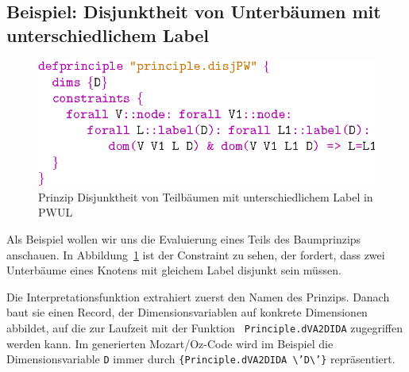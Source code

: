 \subsection{Beispiel: Disjunktheit von Unterb\"aumen mit
  unterschiedlichem Label}
\begin{figure}
\begin{center}
\includegraphics[scale=1.0]{eps/disj}
\end{center}
\caption{Prinzip Disjunktheit von Teilb\"aumen mit unterschiedlichem
  Label in PWUL}
\label{disjunktPW}
\end{figure}
Als Beispiel wollen wir uns die Evaluierung eines Teils des
Baumprinzips anschauen. In Abbildung~\ref{disjunktPW} ist der
Constraint zu sehen, der fordert, dass zwei Unterb\"aume eines Knotens
mit gleichem Label disjunkt sein m\"ussen.

Die Interpretationsfunktion extrahiert zuerst den Namen des Prinzips.
Danach baut sie einen Record, der Dimensionsvariablen auf konkrete
Dimensionen abbildet, auf die zur Laufzeit mit der Funktion {\tt
  Principle.dVA2DIDA} zugegriffen werden kann. Im generierten
Mozart/Oz-Code wird im Beispiel die Dimensionsvariable {\tt D} immer
durch {\tt \{Principle.dVA2DIDA \verb=\='D\verb=\='\}}
repr\"asentiert.

